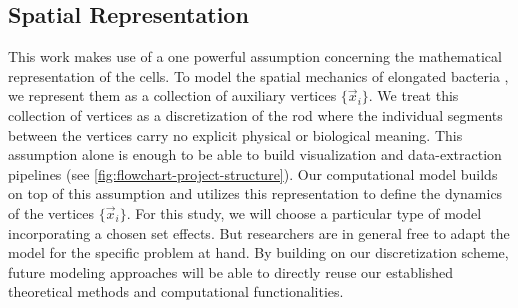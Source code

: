 \subsection{Spatial Representation}
\label{subsec:spatial-representation}
This work makes use of a one powerful assumption concerning the mathematical representation of the
cells.
To model the spatial mechanics of elongated bacteria \cite{Billaudeau2017}, we represent them as a
collection of auxiliary vertices $\{\vec{x}_i\}$.
We treat this collection of vertices as a discretization of the rod where the individual segments
between the vertices carry no explicit physical or biological meaning.
This assumption alone is enough to be able to build visualization and data-extraction pipelines (see
\ref{fig:flowchart-project-structure}).
Our computational model builds on top of this assumption and utilizes this representation to
define the dynamics of the vertices $\{\vec{x}_i\}$.
For this study, we will choose a particular type of model incorporating a chosen set effects.
But researchers are in general free to adapt the model for the specific problem at hand.
By building on our discretization scheme, future modeling approaches will be able to directly reuse
our established theoretical methods and computational functionalities.

